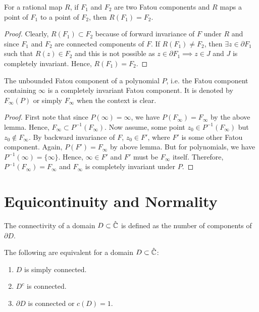 \begin{lemma}\label{lem1.1}
	For a rational map \( R \), if \( F_1 \) and \( F_2 \) are two Fatou components and \( R \)
	maps a point of \( F_1 \) to a point of \( F_2 \), then \( R(F_1)=F_2 \).
\end{lemma}
\begin{proof}
Clearly, \( R(F_1)\subset F_2 \) because of forward invariance of \( F \) under \( R \) and since \( F_1 \) and \( F_2 \)
are connected components of \( F \). If \( R(F_1)\neq F_2 \), then \( \exists z \in \partial F_1 \) such that \( R(z)\in F_2 \) and
this is not possible as \( z\in \partial F_1\implies z\in J \) and \( J \) is completely invariant. Hence, \( R(F_1)=F_2 \).
\end{proof}

\begin{theorem}\label{thm1.4}
	The unbounded Fatou component of a polynomial \( P \), i.e. the Fatou component containing \( \infty \)
	is a completely invariant Fatou component. It is denoted by \( F_\infty(P) \) or simply \( F_\infty \) when
	the context is clear.
\end{theorem}
\begin{proof}
	First note that since \( P(\infty)=\infty \), we have \( P(F_\infty)=F_\infty \) by the above lemma. Hence, \( F_\infty \subset P^{-1}(F_\infty) \).
	Now assume, some point \( z_0\in P^{-1}(F_\infty) \) but \( z_0\not\in F_\infty \). By backward invariance of \( F \),  \( z_0\in F' \),
	where \( F' \) is some other Fatou component. Again, \( P(F')=F_\infty \) by above lemma. But for polynomials, we have \( P^{-1}(\infty)=\{\infty\}\). Hence, \( \infty \in F' \) and \( F' \) must be \( F_\infty \) itself. Therefore, \( P^{-1}(F_\infty)=F_\infty \) and \( F_\infty \) is completely invariant under \( P \).
\end{proof}

\section{Equicontinuity and Normality}

\begin{definition}[Connectivity]
	The connectivity of a domain \( D \subset \hat{\mathbb{C}} \) is defined as the number
	of components of \( \partial D \).
\end{definition}

\begin{theorem}\label{thm1.1}
	The following are equivalent for a domain \( D\subset \hat{\mathbb{C}} \):
	\begin{enumerate}
		\item \( D \) is simply connected.
		\item \( D^c \) is connected.
		\item \( \partial D \) is connected or \( c(D)=1 \).
	\end{enumerate}
\end{theorem}

